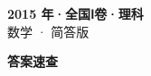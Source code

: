 \documentclass[zihao=-4, a4paper]{ctexart}
\begin{document}
\begin{center}
  {\Large\bfseries 2015 年·全国Ⅰ卷·理科}\\[4pt]
  {\large 数学 · 简答版}
\end{center}
\medskip
{}

\clearpage
{}
\begin{center}{\Large\bfseries 答案速查}\end{center}
\medskip

\end{document}
